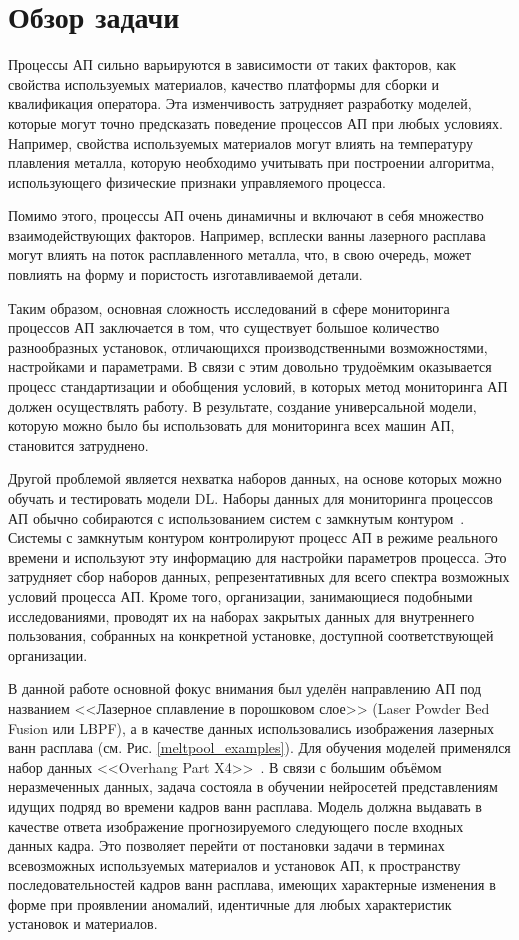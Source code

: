 \documentclass{article}
\begin{document}
\section{Обзор задачи}
    Процессы АП сильно варьируются в зависимости от таких факторов, как свойства используемых материалов, качество платформы для сборки и квалификация оператора. Эта изменчивость затрудняет разработку моделей, которые могут точно предсказать поведение процессов АП при любых условиях. Например, свойства используемых материалов могут влиять на температуру плавления металла, которую необходимо учитывать при построении алгоритма, использующего физические признаки управляемого процесса.

    Помимо этого, процессы АП очень динамичны и включают в себя множество взаимодействующих факторов. Например, всплески ванны лазерного расплава могут влиять на поток расплавленного металла, что, в свою очередь, может повлиять на форму и пористость изготавливаемой детали.

    Таким образом, основная сложность исследований в сфере мониторинга процессов АП заключается в том, что существует большое количество разнообразных установок, отличающихся производственными возможностями, настройками и параметрами. В связи с этим довольно трудоёмким оказывается процесс стандартизации и обобщения условий, в которых метод мониторинга АП должен осуществлять работу. В результате, создание универсальной модели, которую можно было бы использовать для мониторинга всех машин АП, становится затруднено.
    
    Другой проблемой является нехватка наборов данных, на основе которых можно обучать и тестировать модели DL. Наборы данных для мониторинга процессов АП обычно собираются с использованием систем с замкнутым контуром~\cite{closed-loop}. Системы с замкнутым контуром контролируют процесс АП в режиме реального времени и используют эту информацию для настройки параметров процесса. Это затрудняет сбор наборов данных, репрезентативных для всего спектра возможных условий процесса АП. Кроме того, организации, занимающиеся подобными исследованиями, проводят их на наборах закрытых данных для внутреннего пользования, собранных на конкретной установке, доступной соответствующей организации.

    В данной работе основной фокус внимания был уделён направлению АП под названием <<Лазерное сплавление в порошковом слое>> (Laser Powder Bed Fusion или LBPF), а в качестве данных использовались изображения лазерных ванн расплава (см. Рис. \ref{meltpool_examples}). Для обучения моделей применялся набор данных <<Overhang Part X4>>~\cite{nist_dataset}. В связи с большим объёмом неразмеченных данных, задача состояла в обучении нейросетей представлениям идущих подряд во времени кадров ванн расплава. Модель должна выдавать в качестве ответа изображение прогнозируемого следующего после входных данных кадра. Это позволяет перейти от постановки задачи в терминах всевозможных используемых материалов и установок АП, к пространству последовательностей кадров ванн расплава, имеющих характерные изменения в форме при проявлении аномалий, идентичные для любых характеристик установок и материалов.
\end{document}
